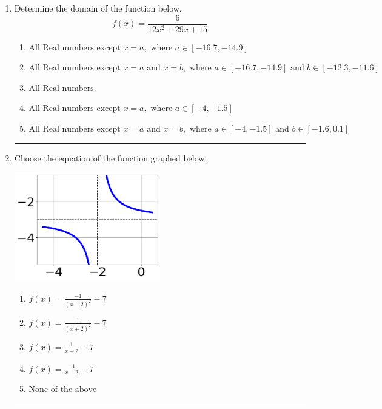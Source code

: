 \documentclass[14pt]{extbook}
\newcommand{\litem}[1]{\item#1\hspace*{-1cm}\rule{\textwidth}{0.4pt}}
\begin{document}
\begin{enumerate}
{\begin{enumerate}[label=\Alph*.]
\end{enumerate} }
\litem{
Determine the domain of the function below.\[ f(x) = \frac{6}{12x^{2} +29 x + 15} \]\begin{enumerate}[label=\Alph*.]
\item \( \text{All Real numbers except } x = a, \text{ where } a \in [-16.7, -14.9] \)
\item \( \text{All Real numbers except } x = a \text{ and } x = b, \text{ where } a \in [-16.7, -14.9] \text{ and } b \in [-12.3, -11.6] \)
\item \( \text{All Real numbers.} \)
\item \( \text{All Real numbers except } x = a, \text{ where } a \in [-4, -1.5] \)
\item \( \text{All Real numbers except } x = a \text{ and } x = b, \text{ where } a \in [-4, -1.5] \text{ and } b \in [-1.6, 0.1] \)

\end{enumerate} }
\litem{
Choose the equation of the function graphed below.
\begin{center}
    \includegraphics[width=0.5\textwidth]{../Figures/rationalGraphToEquationCopyA.png}
\end{center}
\begin{enumerate}[label=\Alph*.]
\item \( f(x) = \frac{-1}{(x - 2)^2} - 7 \)
\item \( f(x) = \frac{1}{(x + 2)^2} - 7 \)
\item \( f(x) = \frac{1}{x + 2} - 7 \)
\item \( f(x) = \frac{-1}{x - 2} - 7 \)
\item \( \text{None of the above} \)


\end{enumerate}}
\end{enumerate}
\end{document}
